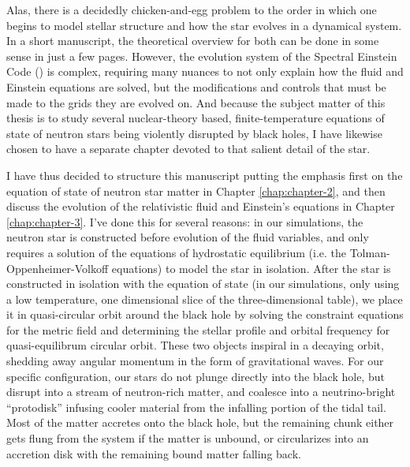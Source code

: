 Alas, there is a decidedly chicken-and-egg problem to the order in which one begins to model stellar structure and how the star evolves in a dynamical system.
In a short manuscript, the theoretical overview for both can be done in some sense in just a few pages. 
However, the evolution system of the Spectral Einstein Code (\SpEC) is complex, requiring many nuances to not only explain how the fluid and Einstein equations are solved, but the modifications and controls that must be made to the grids they are evolved on.
And because the subject matter of this thesis is to study several nuclear-theory based, finite-temperature equations of state of neutron stars being violently disrupted by black holes, I have likewise chosen to have a separate chapter devoted to that salient detail of the star.

I have thus decided to structure this manuscript putting the emphasis first on the equation of state of neutron star matter in Chapter \ref{chap:chapter-2}, and then discuss the evolution of the relativistic fluid and Einstein's equations in Chapter \ref{chap:chapter-3}.  
I've done this for several reasons: 
in our simulations, the neutron star is constructed before evolution of the fluid variables, and only requires a solution of the equations of hydrostatic equilibrium (i.e. the Tolman-Oppenheimer-Volkoff equations) to model the star in isolation.  
After the star is constructed in isolation with the equation of state (in our simulations, only using a low temperature, one dimensional slice of the three-dimensional table), we place it in quasi-circular orbit around the black hole by solving the constraint equations for the metric field and determining the stellar profile and orbital frequency for quasi-equilibrum circular orbit.
These two objects inspiral in a decaying orbit, shedding away angular momentum in the form of gravitational waves.  
For our specific configuration, our stars do not plunge directly into the black hole, but disrupt into a stream of neutron-rich matter, and coalesce into a neutrino-bright ``protodisk'' infusing cooler material from the infalling portion of the tidal tail. 
Most of the matter accretes onto the black hole, but the remaining chunk either gets flung from the system if the matter is unbound, or circularizes into an accretion disk with the remaining bound matter falling back.